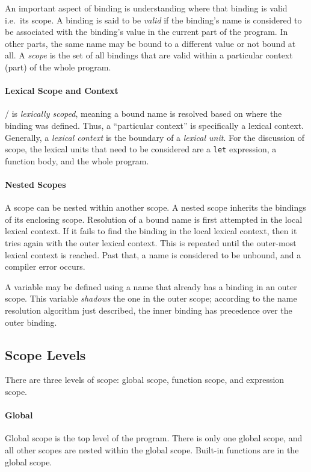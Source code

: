 An important aspect of binding is understanding where that binding is valid i.e.\ its scope. A binding is said to be \textit{valid} if the binding's name is considered to be associated with the binding's value in the current part of the program. In other parts, the same name may be bound to a different value or not bound at all. A \textit{scope} is the set of all bindings that are valid within a particular context (part) of the whole program.

\paragraph{Lexical Scope and Context}
\lispy/ is \textit{lexically scoped}, meaning a bound name is resolved based on where the binding was defined. Thus, a ``particular context'' is specifically a lexical context. Generally, a \textit{lexical context} is the boundary of a \textit{lexical unit}. For the discussion of scope, the lexical units that need to be considered are a \texttt{let} expression, a function body, and the whole program.

\paragraph{Nested Scopes}
A scope can be nested within another scope. A nested scope inherits the bindings of its enclosing scope. Resolution of a bound name is first attempted in the local lexical context. If it fails to find the binding in the local lexical context, then it tries again with the outer lexical context. This is repeated until the outer-most lexical context is reached. Past that, a name is considered to be unbound, and a compiler error occurs.

A variable may be defined using a name that already has a binding in an outer scope. This variable \textit{shadows} the one in the outer scope; according to the name resolution algorithm just described, the inner binding has precedence over the outer binding.

\subsection{Scope Levels}
There are three levels of scope: global scope, function scope, and expression scope.

\paragraph{Global}
Global scope is the top level of the program. There is only one global scope, and all other scopes are nested within the global scope. Built-in functions are in the global scope.

